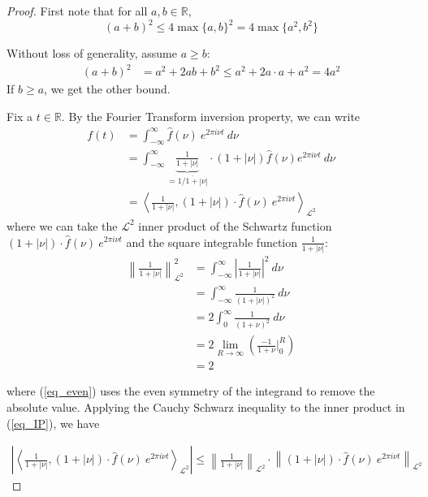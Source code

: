 \documentclass[12pt, reqno]{article}
\theoremstyle{definition}
\theoremstyle{remark}
\begin{document}
\begin{proof}
    First note that for all $a,b\in \mathbb{R}$,
\begin{equation} \label{eq_useful-bound}
 (a + b )^2 \leq 4 \max\{ a , b \}^2 = 4 \max\{a^2,b^2\}
\end{equation}

Without loss of generality, assume $a\ge b$: 
\begin{align*}
    (a+b)^2&=a^2+2ab+b^2\le a^2+2a\cdot a+a^2= 4a^2
\end{align*}
If $b\ge a$, we get the other bound.

\vspace*{10 pt}

Fix a $t\in \mathbb{R}$. By the Fourier Transform inversion property, we can write
\begin{align}
f(t)&= \int_{-\infty}^{\infty}\widehat f(\nu)~e^{2\pi i \nu t}\ d\nu \\
&= \int_{-\infty}^{\infty} \underbrace{\frac{1}{1+|\nu|}}_{= \overline{ 1/1+|\nu|}}\cdot(1+|\nu|)\widehat f(\nu)e^{2\pi i \nu t}\ d \nu\\
&= \left\langle \frac{1}{1+|\nu|},(1+|\nu|)\cdot\widehat f(\nu)~e^{2\pi i \nu t}\right\rangle_{\mathcal{L}^{2}} \label{eq_IP}
\end{align}
where we can take the $\mathcal{L}^{2}$ inner product of the Schwartz function $(1+|\nu|)\cdot \widehat f(\nu)~e^{2\pi i \nu t}$ and the square integrable function $\frac{1}{1+|\nu|}$:
\begin{align}
\left\| \frac{1}{1+|\nu|}\right\|_{\mathcal{L}^{2}}^{2}&= \int_{-\infty}^{\infty} \left|\frac{1}{1+|\nu|}\right|^{2}\ d \nu\\
&= \int_{-\infty}^{\infty} \frac{1}{(1+|\nu|)^{2}}\ d \nu \label{eq_even}
\\
&= 2\int_{0}^{\infty} \frac{1}{(1+\nu)^{2}}\ d \nu\\
&= 2\lim_{R \rightarrow \infty} \left(\frac{-1}{1+\nu}\bigg|_{0}^{R}\right)\\
&= 2
\end{align}

where (\ref{eq_even}) uses the even symmetry of the integrand to remove the absolute value. Applying the Cauchy Schwarz inequality to the inner product in (\ref{eq_IP}), we have 

\begin{align*}
\left|\left\langle \frac{1}{1+|\nu|},(1+|\nu|)\cdot\widehat f(\nu)~e^{2\pi i \nu t}\right\rangle_{\mathcal{L}^{2}}\right|\le \left\| \frac{1}{1+|\nu|}\right\|_{\mathcal{L}^{2}}\cdot \left\|(1+|\nu|)\cdot\widehat f(\nu)~e^{2\pi i \nu t}\right\|_{\mathcal{L}^{2}}
\end{align*}


\end{proof}
\end{document}
